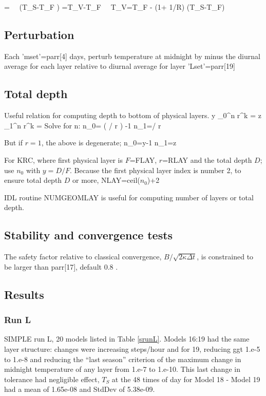 \documentclass{article}
\begin{document}
\qb {} =   
\ \mapsto \  \left(T_S-T_F \right)   =T_V-T_F
\ \mapsto \ T_V=T_F - (1+ 1/R) (T_S-T_F)\qe

\subsection{Perturbation} 

Each 'mset'=parr[4] days, perturb temperature at midnight by minus the diurnal average for each layer relative to diurnal average for layer 'Lset'=parr[19]

\subsection{Total depth}
Useful relation for computing depth to bottom of physical layers.
\qb y \equiv \sum_0^n r^k =     
  z \equiv \sum_1^n r^k =   \qe
Solve for n:
\qb n_0= \left( \ln \left[ 1+y(r-1) \right]  / \ln r \right) -1  
n_1=\ln  {} / \ln r \qe

But if $r=1$, the above is degenerate;  \qb n_0=y-1  n_1=z \qe 

For KRC, where first physical layer is $F$=FLAY, $r$=RLAY and the total depth $D$; use $n_0$ with $y=D/F$. Because the first physical layer index is number 2, to ensure total depth $D$ or more, NLAY=ceil($n_0$)+2

IDL routine NUMGEOMLAY is useful for computing number of layers or total depth.

\subsection{Stability and convergence tests}
The safety factor relative to classical convergence, $ B/\sqrt{2 \kappa \Delta t }$,  is constrained to be larger than parr[17], default 0.8 .
 
 
\subsection{Results} 
\subsubsection{Run L} %

SIMPLE run L, 20 models listed in Table \ref{srunL}.  Models 16:19 had the same
layer structure: changes were increasing steps/hour and for 19, reducing ggt
1.e-5 to 1.e-8 and reducing the ``last season'' criterion of the maximum change
in midnight temperature of any layer from 1.e-7 to 1.e-10. This last change in
tolerance had negligible effect, $T_S$ at the 48 times of day for Model 18 -
Model 19 had a mean of 1.65e-08 and StdDev of 5.38e-09.
\end{document}
